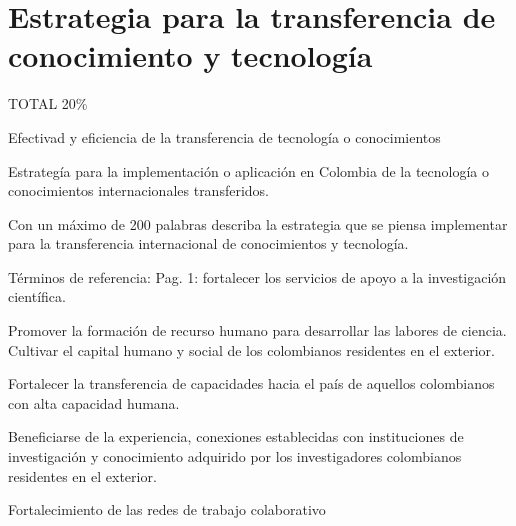 \section{Estrategia para la transferencia de conocimiento y tecnología}
\begin{evaluacion}
  TOTAL 20\%

  Efectivad y eficiencia de la transferencia de tecnología o conocimientos 

  Estrategía para la implementación o aplicación en Colombia de la
  tecnología o conocimientos internacionales transferidos.
\end{evaluacion}

\begin{instrucciones}
Con un máximo de 200 palabras describa la estrategia que se piensa implementar para la transferencia internacional de conocimientos y tecnología.

  Términos de referencia:
  Pag. 1: fortalecer los servicios de apoyo a la investigación científica.

  Promover la formación de recurso humano para desarrollar las labores de ciencia. 
Cultivar el  capital humano y social de los colombianos residentes en el exterior.

Fortalecer la transferencia de capacidades hacia el país de aquellos colombianos con alta capacidad humana. 

Beneficiarse de la experiencia, conexiones establecidas con instituciones de investigación y conocimiento adquirido por los investigadores colombianos residentes en el exterior.

Fortalecimiento de las redes de trabajo colaborativo
\end{instrucciones}


